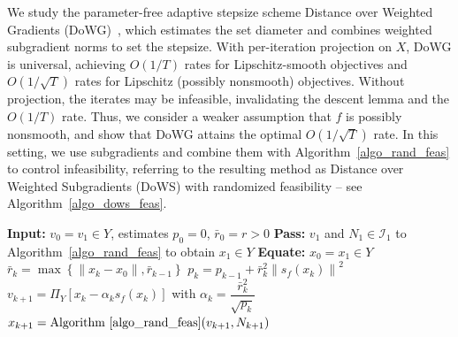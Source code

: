 \documentclass{article}
\newcommand{\EXP}[1]
{\mathbb{E}\!\left[#1\right] }
\theoremstyle{plain}
\theoremstyle{definition}
\theoremstyle{remark}
\begin{document}
We study the parameter-free adaptive stepsize scheme Distance over Weighted Gradients (DoWG)~\cite{khaled2023dowg,khaled2024tuning}, which estimates the set diameter and combines weighted subgradient norms to set the stepsize. With per-iteration projection on $X$, DoWG is universal, achieving $O(1/T)$ rates for Lipschitz-smooth objectives and $O(1/\sqrt{T})$ rates for Lipschitz (possibly nonsmooth) objectives. Without projection, the iterates may be infeasible, invalidating the descent lemma and the $O(1/T)$ rate. Thus, we consider a weaker assumption that $f$ is possibly nonsmooth, and show that DoWG attains the optimal $O(1/\sqrt{T})$ rate. In this setting, we use subgradients and combine them with Algorithm~\ref{algo_rand_feas} to control infeasibility, referring to the resulting method as Distance over Weighted Subgradients (DoWS) with randomized feasibility -- see Algorithm~\ref{algo_dows_feas}.

%
%
%
%
\begin{algorithm}
\caption{DoWS with Randomized Feasibility}
\label{algo_dows_feas}
\begin{algorithmic}[1]
\STATE \textbf{Input:} $v_0 = v_1 \in Y$, estimates $p_{0} = 0$, $\bar r_{0} = r > 0$
\STATE \textbf{Pass:} $v_1$ and $N_{1} \in \mathcal{I}_{1}$ to Algorithm~\ref{algo_rand_feas} to obtain $x_1 \in Y$
\STATE \textbf{Equate:} $x_0 = x_1 \in Y$
    \STATE $\bar{r}_k = \max\left\{ \|x_k - x_0\|, \bar{r}_{k-1} \right\}$
    \STATE $p_k = p_{k-1} + \bar{r}_k^2 \left\| s_f(x_k) \right\|^2$
    \STATE $v_{k+1} = \Pi_Y \left[ x_k - \alpha_k s_f(x_k) \right]$ with $\alpha_k = \dfrac{\bar{r}_k^2}{\sqrt{p_k}}$
    \STATE $x_{k+1} = \text{Algorithm~\ref{algo_rand_feas}}(v_{k+1}, N_{k+1})$
\ENDFOR
\end{algorithmic}
\end{algorithm}
%
%
%
%
\end{document}
